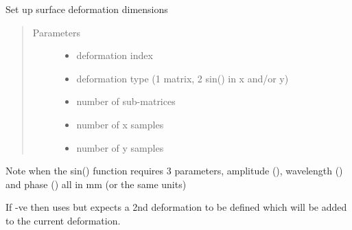 \documentclass[letterpaper,10pt,english]{sphinxmanual}
\begin{document}
\begin{fulllineitems}
\label{\detokenize{xsrt_functions:xsrt.deform}}
Set up surface deformation dimensions
\begin{quote}\begin{description}
\item[{Parameters}] \leavevmode\begin{itemize}
\item {} 
 \textendash{} deformation index

\item {} 
 \textendash{} deformation type (1 matrix, 2 sin() in x and/or y)

\item {} 
 \textendash{} number of sub-matrices

\item {} 
 \textendash{} number of x samples

\item {} 
 \textendash{} number of y samples

\end{itemize}

\end{description}\end{quote}

Note when  the sin() function requires 3 parameters, amplitude (),
wavelength () and phase () all in mm (or the same units)

If  -ve then uses  but expects a 2nd deformation to be
defined which will be added to the current deformation.

\end{fulllineitems}

\end{document}
